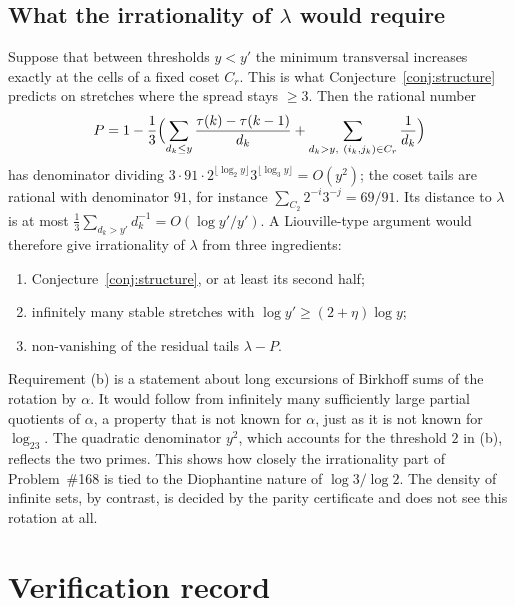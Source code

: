 \documentclass[11pt]{amsart}
\theoremstyle{definition}
\begin{document}
\subsection{What the irrationality of \texorpdfstring{$\lambda$}{lambda} would require}\label{subsec:barrier}
Suppose that between thresholds $y<y'$ the minimum transversal increases exactly at the cells of a fixed coset $C_r$. This is what Conjecture~\ref{conj:structure} predicts on stretches where the spread stays $\ge3$. Then the rational number
\[
P=1-\frac13\Bigl(\sum_{d_k\le y}\frac{\tau(k)-\tau(k-1)}{d_k}+\sum_{d_k>y,\ (i_k,j_k)\in C_r}\frac1{d_k}\Bigr)
\]
has denominator dividing $3\cdot91\cdot 2^{\lfloor\log_2y\rfloor}3^{\lfloor\log_3y\rfloor}=O(y^2)$; the coset tails are rational with denominator $91$, for instance $\sum_{C_2}2^{-i}3^{-j}=69/91$. Its distance to $\lambda$ is at most $\frac13\sum_{d_k>y'}d_k^{-1}=O(\log y'/y')$. A Liouville-type argument would therefore give irrationality of $\lambda$ from three ingredients:
\begin{enumerate}[label=(\alph*)]
\item Conjecture~\ref{conj:structure}, or at least its second half;
\item infinitely many stable stretches with $\log y'\ge(2+\eta)\log y$;
\item non-vanishing of the residual tails $\lambda-P$.
\end{enumerate}
Requirement (b) is a statement about long excursions of Birkhoff sums of the rotation by $\alpha$. It would follow from infinitely many sufficiently large partial quotients of $\alpha$, a property that is not known for $\alpha$, just as it is not known for $\log_23$. The quadratic denominator $y^2$, which accounts for the threshold $2$ in (b), reflects the two primes. This shows how closely the irrationality part of Problem~\#168 is tied to the Diophantine nature of $\log 3/\log 2$. The density of infinite sets, by contrast, is decided by the parity certificate and does not see this rotation at all.

\section{Verification record}\label{sec:verify}
\end{document}
